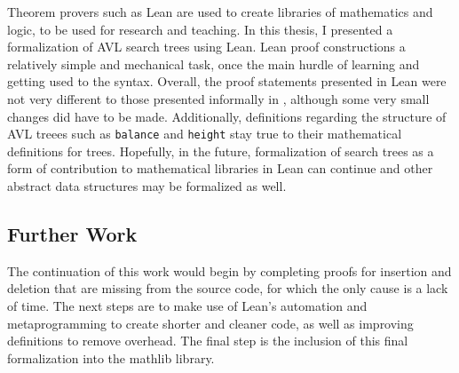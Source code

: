 Theorem provers such as Lean are used to create libraries of mathematics and logic, to be used for research and teaching. In this thesis, I presented a formalization of AVL search trees using Lean. Lean proof constructions a relatively simple and mechanical task, once the main hurdle of learning and getting used to the syntax. Overall, the proof statements presented in Lean were not very different to those presented informally in \cite{textbook:discrete_computer}, although some very small changes did have to be made. Additionally, definitions regarding the structure of AVL treees such as \lstinline{balance} and \lstinline{height} stay true to their mathematical definitions for trees. Hopefully, in the future, formalization of search trees as a form of contribution to mathematical libraries in Lean can continue and other abstract data structures may be formalized as well.

\subsection*{Further Work}
The continuation of this work would begin by completing proofs for insertion and deletion that are missing from the source code, for which the only cause is a lack of time. The next steps are to make use of Lean's automation and metaprogramming to create shorter and cleaner code, as well as improving definitions to remove overhead. The final step is the inclusion of this final formalization into the mathlib library.